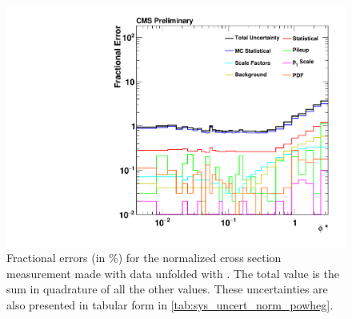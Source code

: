 \begin{figure}[!p]
    \centering
    \includegraphics[width=\textwidth]{figures/data_uncertainty_normalized_powheg_unfolded.pdf}
    \caption[
        Fractional errors for the normalized cross section measurement
        made with data unfolded with \POWHEG.
    ]{
        Fractional errors (in \%) for the normalized cross section measurement
        made with data unfolded with \POWHEG. The total value is the sum in
        quadrature of all the other values. These uncertainties are also
        presented in tabular form in \cref{tab:sys_uncert_norm_powheg}.
    }
    \label{fig:sys_uncert_norm_powheg}
\end{figure}
